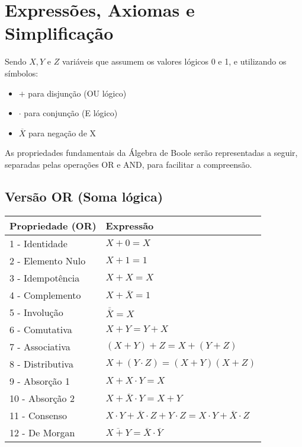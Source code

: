 \documentclass[12pt]{article}
\begin{document}
\section{Expressões, Axiomas e Simplificação}

Sendo \( X, Y\) e \( Z\) variáveis que assumem os valores lógicos 0 e 1, e utilizando os símbolos:
\begin{itemize}
   \item \( + \) para disjunção (OU lógico)
   \item \( \cdot \) para conjunção (E lógico)
   \item \( \overline{X} \) para negação de X
\end{itemize}

As propriedades fundamentais da Álgebra de Boole serão representadas a seguir, separadas pelas operações OR e AND, para facilitar a compreensão.
\subsection{Versão OR (Soma lógica)}

\begin{center}
\begin{tabular}{|l|l|}
\hline
\textbf{Propriedade (OR)} & \textbf{Expressão} \\
\hline
1 - Identidade       & \( X + 0 = X \) \\
2 - Elemento Nulo    & \( X + 1 = 1 \) \\
3 - Idempotência     & \( X + X = X \) \\
4 - Complemento      & \( X + \overline{X} = 1 \) \\
5 - Involução        & \( \overline{\overline{X}} = X \) \\
6 - Comutativa       & \( X + Y = Y + X \) \\
7 - Associativa      & \( (X + Y) + Z = X + (Y + Z) \) \\
8 - Distributiva     & \( X + (Y \cdot Z) = (X + Y)(X + Z) \) \\
9 - Absorção 1       & \( X + X \cdot Y = X \) \\
10 - Absorção 2      & \( X + \overline{X} \cdot Y = X + Y \) \\
11 - Consenso        & \( X \cdot Y + \overline{X} \cdot Z + Y \cdot Z = X \cdot Y + \overline{X} \cdot Z \) \\
12 - De Morgan       & \( \overline{X + Y} = \overline{X} \cdot \overline{Y} \) \\
\hline
\end{tabular}
\end{center}
\end{document}
